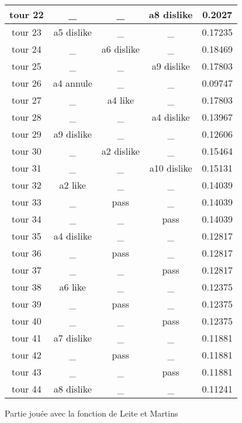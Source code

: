\documentclass{article}
\begin{document}
\begin{figure}
{\begin{tabular}{|c|c|c|c|c|}
       \hline
       tour 22 & \_ & \_ & a8 dislike & 0.2027 \\
       \hline
       tour 23 & a5 dislike & \_ & \_ & 0.17235 \\
       \hline
       tour 24 & \_ & a6 dislike & \_ & 0.18469 \\
       \hline
       tour 25 & \_ & \_ & a9 dislike & 0.17803 \\
       \hline
       tour 26 & a4 annule & \_ & \_ & 0.09747 \\
       \hline
       tour 27 & \_ & a4 like & \_ & 0.17803 \\
       \hline
       tour 28 & \_ & \_ & a4 dislike & 0.13967 \\
       \hline
       tour 29 & a9 dislike & \_ & \_ & 0.12606 \\
       \hline
       tour 30 & \_ & a2 dislike & \_ & 0.15464 \\
       \hline
       tour 31 & \_ & \_ & a10 dislike & 0.15131 \\
       \hline
       tour 32 & a2 like & \_ & \_ & 0.14039 \\
       \hline
       tour 33 & \_ & pass & \_ & 0.14039 \\
       \hline
       tour 34 & \_ & \_ & pass & 0.14039 \\
       \hline
       tour 35 & a4 dislike & \_ & \_ & 0.12817 \\
       \hline
       tour 36 & \_ & pass & \_ & 0.12817 \\
       \hline
       tour 37 & \_ & \_ & pass & 0.12817 \\
       \hline
       tour 38 & a6 like & \_ & \_ & 0.12375 \\
       \hline
       tour 39 & \_ & pass & \_ & 0.12375 \\
       \hline
       tour 40 & \_ & \_ & pass & 0.12375 \\
       \hline
       tour 41 & a7 dislike & \_ & \_ & 0.11881 \\
       \hline
       tour 42 & \_ & pass & \_ & 0.11881 \\
       \hline
       tour 43 & \_ & \_ & pass & 0.11881 \\
       \hline
       tour 44 & a8 dislike & \_ & \_ & 0.11241 \\
       \hline

       \end{tabular}
       }
     \caption{Partie jouée avec la fonction de Leite et Martins}
\end{figure}
\end{document}
